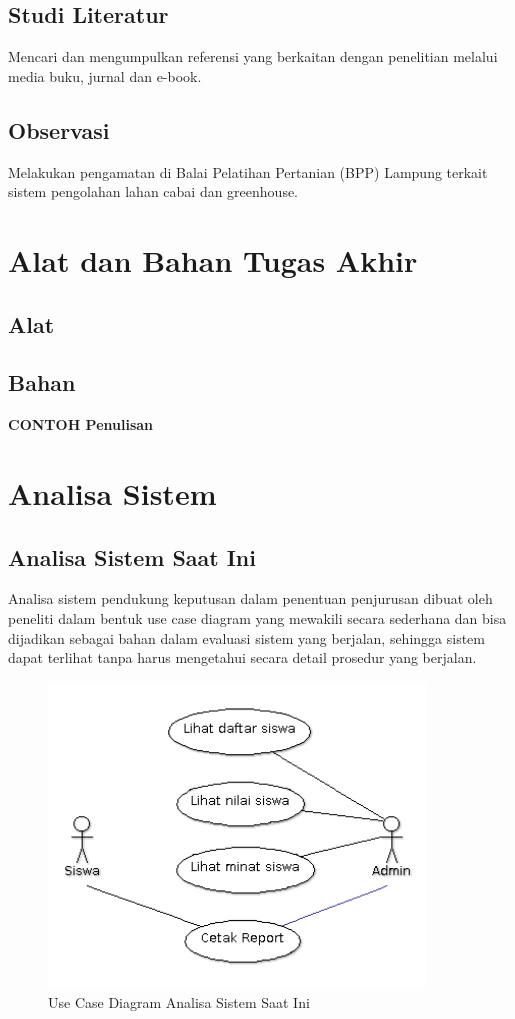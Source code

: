 \begin{flushleft}
\begin{justify}
   \subsection{Studi Literatur}
 Mencari dan mengumpulkan referensi yang berkaitan dengan penelitian melalui media buku, jurnal dan e-book.
      
\subsection{Observasi}
Melakukan pengamatan di Balai Pelatihan Pertanian (BPP) Lampung terkait sistem pengolahan lahan cabai dan greenhouse.
   \section{Alat dan Bahan Tugas Akhir}
   \subsection{Alat}
   \subsection{Bahan}
   \end{justify}
   
\end{flushleft}

\vspace{5cm}
\noindent \textbf{CONTOH Penulisan}
\section{Analisa Sistem}

\subsection{Analisa Sistem Saat Ini}
Analisa sistem pendukung keputusan dalam penentuan penjurusan dibuat oleh peneliti dalam bentuk use case diagram yang mewakili secara sederhana dan bisa dijadikan sebagai bahan dalam evaluasi sistem yang berjalan, sehingga sistem dapat terlihat tanpa harus mengetahui secara detail prosedur yang berjalan.
\begin{figure}[ht]
	\centering
	\includegraphics[width=10cm]{images/UseCaseDiagramSistemSaatIni}
	\caption{Use Case Diagram Analisa Sistem Saat Ini}
\end{figure}

